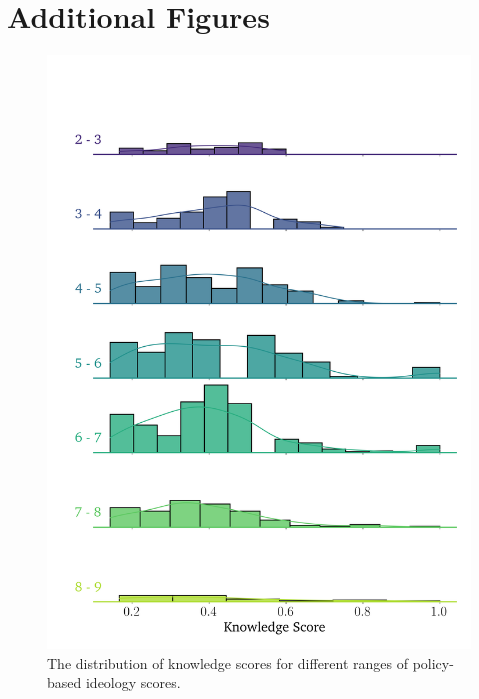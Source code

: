 \newpage

\section{Additional Figures}
\label{AppendixB:figure}

\begin{figure}[ht]
	\begin{center}
		\includegraphics[width=.7\textwidth]{Figures/knowledge_pbs_dist.png}
	\end{center}
	\caption{The distribution of knowledge scores for different ranges of policy-based ideology scores.}\label{fig:knowledge_pbs}
\end{figure}

